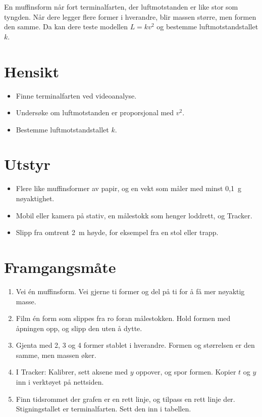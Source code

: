 \documentclass[11pt]{article}
\begin{document}

En muffinsform når fort terminalfarten, der luftmotstanden er like stor som tyngden. Når dere legger flere former i hverandre, blir massen større, men formen den samme. Da kan dere teste modellen $L = kv^{2}$ og bestemme luftmotstandstallet $k$.

\section*{Hensikt}

\begin{itemize}
\item Finne terminalfarten ved videoanalyse.
\item Undersøke om luftmotstanden er proporsjonal med $v^{2}$.
\item Bestemme luftmotstandstallet $k$.
\end{itemize}

\section*{Utstyr}

\begin{itemize}
\item Flere like muffinsformer av papir, og en vekt som måler med minst 0,1~g nøyaktighet.
\item Mobil eller kamera på stativ, en målestokk som henger loddrett, og Tracker.
\item Slipp fra omtrent 2~m høyde, for eksempel fra en stol eller trapp.
\end{itemize}

\section*{Framgangsmåte}

\begin{enumerate}
\item Vei én muffinsform. Vei gjerne ti former og del på ti for å få mer nøyaktig masse.
\item Film én form som slippes fra ro foran målestokken. Hold formen med åpningen opp, og slipp den uten å dytte.
\item Gjenta med 2, 3 og 4 former stablet i hverandre. Formen og størrelsen er den samme, men massen øker.
\item I Tracker: Kalibrer, sett aksene med $y$ oppover, og spor formen. Kopier $t$ og $y$ inn i verktøyet på nettsiden.
\item Finn tidsrommet der grafen er en rett linje, og tilpass en rett linje der. Stigningstallet er terminalfarten. Sett den inn i tabellen.
\end{enumerate}
\end{document}
